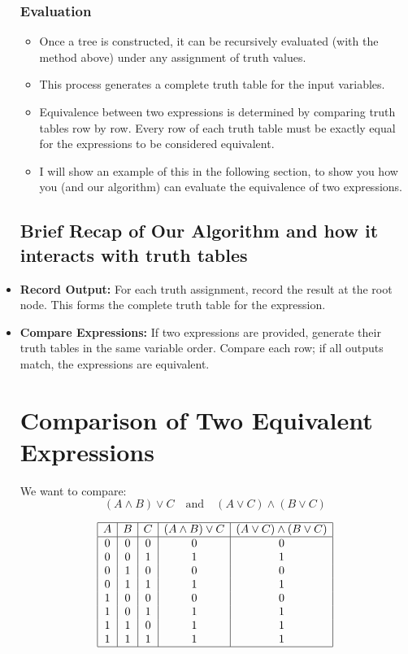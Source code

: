 \documentclass[11pt]{diazessay} %
\begin{document}
\begin{itemize}
\subsubsection*{Evaluation}
\begin{itemize}
    \item Once a tree is constructed, it can be recursively evaluated (with the method above) under any 
    assignment of truth values. 
    \item This process generates a complete truth table for the input variables.
    \item Equivalence between two expressions is determined by comparing truth 
    tables row by row. Every row of each truth table must be exactly equal for the expressions to be considered equivalent.
	\item I will show an example of this in the following section, to show you how you (and our algorithm) can evaluate the equivalence of two expressions.
\end{itemize}

\subsection{Brief Recap of Our Algorithm and how it interacts with truth tables}
\item \textbf{Record Output:} For each truth assignment, record the result at the root node. This forms the complete truth table for the expression.
    \item \textbf{Compare Expressions:} If two expressions are provided, generate their truth tables in the same variable order. Compare each row; if all outputs match, the expressions are equivalent.

\section*{Comparison of Two Equivalent Expressions}

We want to compare:
\[
(A \wedge B) \vee C \quad \text{and} \quad (A \vee C) \wedge (B \vee C)
\]

\bigskip

\[
\begin{array}{|c|c|c|c|c|}
\hline
A & B & C & (A \land B) \lor C & (A \lor C) \land (B \lor C) \\
\hline
0 & 0 & 0 & 0 & 0 \\
0 & 0 & 1 & 1 & 1 \\
0 & 1 & 0 & 0 & 0 \\
0 & 1 & 1 & 1 & 1 \\
1 & 0 & 0 & 0 & 0 \\
1 & 0 & 1 & 1 & 1 \\
1 & 1 & 0 & 1 & 1 \\
1 & 1 & 1 & 1 & 1 \\
\hline
\end{array}
\]


\end{itemize}
\end{document}
